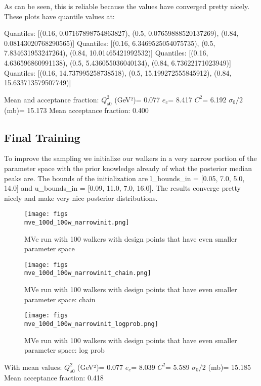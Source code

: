 \documentclass{article}
\begin{document}
As can be seen, this is reliable because the values have converged pretty nicely. These plots have quantile values at:

Quantiles: [(0.16, 0.07167898754863827), (0.5, 0.07659888520137269), (0.84, 0.08143020768290565)]
Quantiles: [(0.16, 6.3469525054075735), (0.5, 7.834631953247264), (0.84, 10.01465421992532)]
Quantiles: [(0.16, 4.636596860991138), (0.5, 5.436055036040134), (0.84, 6.73622171023949)]
Quantiles: [(0.16, 14.737995258738518), (0.5, 15.199272555845912), (0.84, 15.633713579507749)]

Mean and acceptance fraction:
$Q_{s0}^{2}$ (GeV²)= 0.077
$e_c$= 8.417
$C^{2}$= 6.192
$\sigma_0/2$ (mb)= 15.173
Mean acceptance fraction: 0.400

\subsection{Final Training}

To improve the sampling we initialize our walkers in a very narrow portion of the parameter space with the prior knowledge already of what the posterior median peaks are. The bounds of the initialization are l_bounds_in = [0.05, 7.0, 5.0, 14.0] and u_bounds_in = [0.09, 11.0, 7.0, 16.0]. The results converge pretty nicely and make very nice posterior distributions.

\begin{figure}
\centering
\texttt{[image: figs\\mve\_100d\_100w\_narrowinit.png]}
\caption{MVe run with 100 walkers with design points that have even smaller parameter space}
\label{fig:mve_100d_100w_narrow}
\end{figure}

\begin{figure}
\centering
\texttt{[image: figs\\mve\_100d\_100w\_narrowinit\_chain.png]}
\caption{MVe run with 100 walkers with design points that have even smaller parameter space: chain}
\label{fig:mve_100d_100w_narrow_chain}
\end{figure}

\begin{figure}
\centering
\texttt{[image: figs\\mve\_100d\_100w\_narrowinit\_logprob.png]}
\caption{MVe run with 100 walkers with design points that have even smaller parameter space: log prob}
\label{fig:mve_100d_100w_narrow_logprob}
\end{figure}

With mean values:
$Q_{s0}^{2}$ (GeV²)= 0.077
$e_c$= 8.039
$C^{2}$= 5.589
$\sigma_0/2$ (mb)= 15.185
Mean acceptance fraction: 0.418
\end{document}
